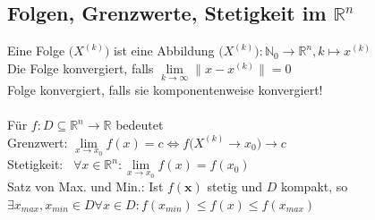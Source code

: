\documentclass[6pt,a4paper]{scrartcl}
\newcommand{\norm}[1]{\ensuremath{\|#1\|}}														%
\renewcommand{\vec}[1]{\ensuremath{\boldsymbol {#1}}}											%
\begin{document}
\begin{multicols*}{4}
\subsection{Folgen, Grenzwerte, Stetigkeit im $\mathbb R^n$}
Eine Folge $\bigl( X^{(k)} \bigr)$ ist eine Abbildung $\bigl(X^{(k)}\bigr):\mathbb N_0 \rightarrow \mathbb R^n, k\mapsto x^{(k)}$\\
Die Folge konvergiert, falls $\lim\limits_{k \rightarrow \infty} \norm{x-x^{(k)}} = 0$\\
Folge konvergiert, falls sie komponentenweise konvergiert!\\
\\
Für $f:D \subseteq \mathbb R^n \rightarrow \mathbb R$ bedeutet \\
Grenzwert: \quad  $\lim\limits_{x \rightarrow x_0} f(x) =c \Leftrightarrow f \bigl(X^{(k)} \rightarrow x_0 \bigr) \rightarrow c$\\
Stetigkeit: \quad \ $\forall x \in \mathbb R^n:\lim\limits_{x \rightarrow x_0} f(x) = f(x_0)$\\
Satz von Max. und Min.: Ist $f(\vec x)$ stetig und $D$ kompakt, so\\
$\exists x_{max},x_{min} \in D \forall x\in D:f(x_{min}) \le f(x) \le f(x_{max})$






\end{multicols*}
\end{document}
